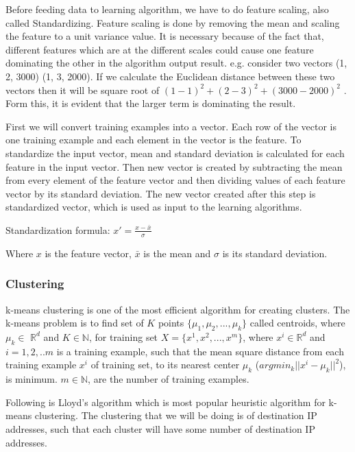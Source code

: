 \documentclass[10pt,oneside,a4paper]{article}
\begin{document}
Before feeding data to learning algorithm, we have to do feature scaling, also called Standardizing. Feature scaling is done by removing the mean and scaling the feature to a unit variance value. It is necessary because of the fact that, different features which are at the different scales could cause one feature dominating the other in the algorithm output result. e.g. consider two vectors (1, 2, 3000) (1, 3, 2000). If we calculate the Euclidean distance between these two vectors then it will be square root of $(1-1)^2 + (2-3)^2 + (3000-2000)^2$ . Form this, it is evident that the larger term is dominating the result.

First we will convert training examples into a vector. Each row of the vector is one training example and each element in the vector is the feature. To standardize the input vector, mean and standard deviation is calculated for each feature in the input vector. Then new vector is created by subtracting the mean from every element of the feature vector and then dividing values of each feature vector by its standard deviation. The new vector created after this step is standardized vector, which is used as input to the learning algorithms.

\hspace{2cm} Standardization formula: $x' = \frac{x - \bar{x}}{\sigma}$

Where $x$ is the feature vector, ${\bar{x}}$ is the mean and $\sigma$  is its standard deviation.

\subsubsection{Clustering}

k-means clustering is one of the most efficient algorithm for creating clusters. The k-means problem is to find set of $K$ points $\{\mu_{1}, \mu_{2}, ..., \mu_{k}\}$ called centroids, where $\mu_{k}\in$ $\mathbb{R}^d$ and $K \in \mathbb{N}$, for training set $X = \{x^{1}, x^{2}, ..., x^{m}\}$, where $x^{i} \in \mathbb{R}^d$
and $i= {1,2, ..m}$ is a training example, such that the mean square distance from each training example $x^{i}$ of training set, to its nearest center $\mu_{k}$ ($argmin_{k} || x^{i} {-} \mu_{k} ||^{2}$), is minimum. $m \in \mathbb{N}$, are the number of training examples.\cite{kmeanClustering}

Following is Lloyd's algorithm  which is most popular heuristic algorithm for k-means clustering. The clustering that we will be doing is of destination IP addresses, such that each cluster will have some number of destination IP addresses.
\end{document}
